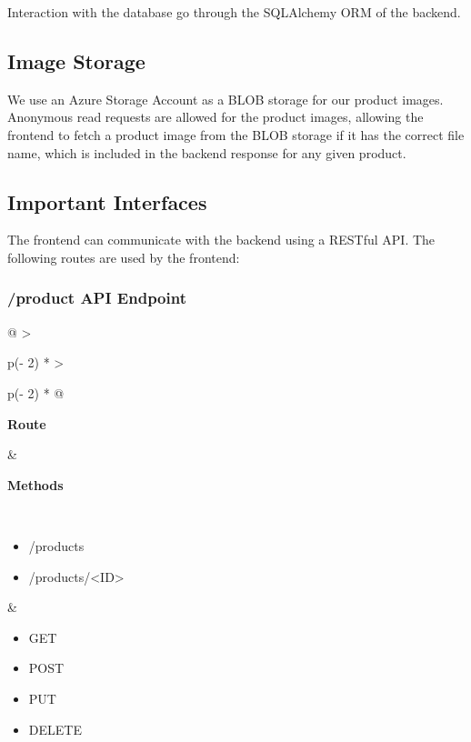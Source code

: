 Interaction with the database go through the SQLAlchemy ORM of the backend.

\subsection{Image Storage}
We use an Azure Storage Account as a BLOB storage for our product images.
Anonymous read requests are allowed for the product images,
allowing the frontend to fetch a product image from the BLOB storage
if it has the correct file name, 
which is included in the backend response for any given product.


\subsection{Important Interfaces}

The frontend can communicate with the backend using a RESTful API.
The following routes are used by the frontend:

\subsubsection{/product API Endpoint}

\begin{longtable}[]{@{}
    >{\raggedright\arraybackslash}p{(\columnwidth - 2\tabcolsep) * }
    >{\raggedright\arraybackslash}p{(\columnwidth - 2\tabcolsep) * }@{}}
\toprule
\begin{minipage}[b]{\linewidth}\raggedright
\textbf{Route}
\end{minipage} & \begin{minipage}[b]{\linewidth}\raggedright
\textbf{Methods}
\end{minipage} \\
\midrule
\endhead
\begin{itemize}
    \item /products
    \item /products/<ID>
\end{itemize} &
\begin{itemize}
  \item GET
  \item POST
  \item PUT
  \item DELETE
\end{itemize} \\
\bottomrule
\end{longtable}

